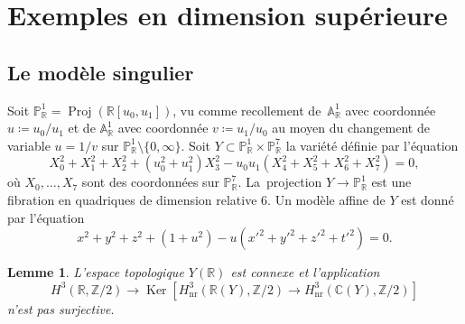 \documentclass[11pt]{article}
\newtheorem{lemma}[thm]{Lemme}
\theoremstyle{definition}
\newcommand{\C}{\mathbb C}
\newcommand{\Z}{\mathbb Z}
\newcommand{\R}{\mathbb R}
\newcommand{\A}{\mathbb A}
\renewcommand{\P}{\mathbb P}
\newcommand{\on}[1]{\operatorname{#1}}
\begin{document}
\section{Exemples en dimension supérieure}\label{dimsup}

\subsection{Le modèle singulier} Soit $\P^1_\R=\on{Proj}(\R[u_0,u_1])$, vu comme recollement de~$\A^1_\R$ avec coordonnée $u\coloneqq u_0/u_1$ et de $\A^1_\R$ avec coordonnée $v\coloneqq u_1/u_0$ au moyen du changement de variable $u=1/v$ sur $\P^1_\R\setminus\{0,\infty\}$. Soit $Y\subset \P^1_\R\times \P^7_\R$ la variété définie par l'équation
\[X_0^2+X_1^2+X_2^2 + (u_0^2+u_1^2)X_3^2 - u_0u_1(X_4^2+X_5^2+X_6^2+X_7^2) =0,\]
où $X_0,\dots,X_7$ sont des coordonnées sur $\P^7_\R$. La~projection $Y\to \P^1_\R$ est une fibration en quadriques de dimension relative $6$. Un modèle affine de $Y$ est donné par l'équation
\begin{equation} \label{eq:affine}
x^2+y^2+z^2 + (1+u^2) - u(x'^2+y'^2+z'^2+t'^2) = 0.
\end{equation}

\begin{lemma}\label{deuxieme-modele}
L'espace topologique $Y(\R)$ est connexe et l'application
\[H^3(\R,\Z/2)\to \on{Ker}[H^3_{\on{nr}}(\R(Y),\Z/2)\to H^3_{\on{nr}}(\C(Y),\Z/2)]\] n'est pas surjective.
\end{lemma}
\end{document}
